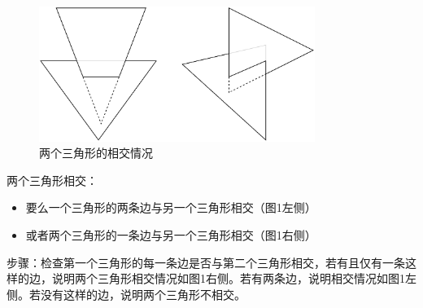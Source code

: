 \documentclass{article}
\begin{document}
\section{}

\begin{figure}
    \centering
    \includegraphics[width=0.8\textwidth]{pic/image-20231212174346327.png}
    \caption{两个三角形的相交情况}
    \label{fig:image}
\end{figure}

两个三角形相交：

\begin{itemize}[leftmargin=2cm]
    \item 要么一个三角形的两条边与另一个三角形相交（图1左侧）
    \item 或者两个三角形的一条边与另一个三角形相交（图1右侧）
\end{itemize}

步骤：检查第一个三角形的每一条边是否与第二个三角形相交，若有且仅有一条这样的边，说明两个三角形相交情况如图1右侧。若有两条边，说明相交情况如图1左侧。若没有这样的边，说明两个三角形不相交。
\end{document}
